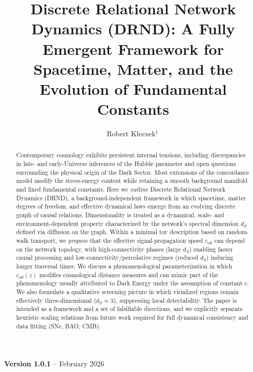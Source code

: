 \documentclass[12pt]{iopart}
\begin{document}
\title[Discrete Relational Network Dynamics]{Discrete Relational Network Dynamics (DRND): A Fully Emergent Framework for Spacetime, Matter, and the Evolution of Fundamental Constants}

\author{Robert K\l{}eczek$^{1}$\,}
\address{$^{1}$Independent Researcher}

\vspace{10pt}
\begin{indented}
\item[]\textbf{Version 1.0.1} -- February 2026
\end{indented}

\begin{abstract}
Contemporary cosmology exhibits persistent internal tensions, including discrepancies in late- and early-Universe inferences of the Hubble parameter and open questions surrounding the physical origin of the Dark Sector. Most extensions of the concordance model modify the stress-energy content while retaining a smooth background manifold and fixed fundamental constants.
Here we \emph{outline} Discrete Relational Network Dynamics (DRND), a background-independent framework in which spacetime, matter degrees of freedom, and effective dynamical laws emerge from an evolving discrete graph of causal relations. Dimensionality is treated as a dynamical, scale- and environment-dependent property characterized by the network's spectral dimension $d_S$ defined via diffusion on the graph.
Within a minimal toy description based on random-walk transport, we \emph{propose} that the effective signal-propagation speed $c_{\mathrm{eff}}$ can depend on the network topology, with high-connectivity phases (large $d_S$) enabling faster causal processing and low-connectivity/percolative regimes (reduced $d_S$) inducing longer traversal times. We discuss a phenomenological parameterization in which $c_{\mathrm{eff}}(z)$ modifies cosmological distance measures and can mimic part of the phenomenology usually attributed to Dark Energy under the assumption of constant $c$. We also formulate a qualitative screening picture in which virialized regions remain effectively three-dimensional ($d_S \simeq 3$), suppressing local detectability.
The paper is intended as a framework and a set of falsifiable directions, and we explicitly separate heuristic scaling relations from future work required for full dynamical consistency and data fitting (SNe, BAO, CMB).
\end{abstract}
\end{document}
